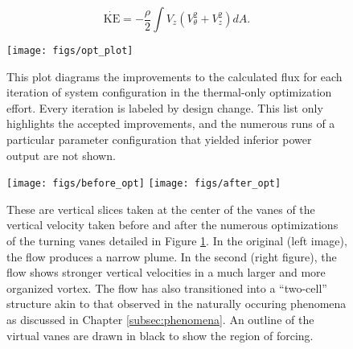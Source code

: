  \begin{equation}
  \dot{ \text{KE}} = -\frac{\rho }{2} \int V_z (V_{\theta}^2 + V_z^2 ) dA.
 \end{equation}

\begin{figure}[htb]
 \centering
 \texttt{[image: figs/opt\_plot]}
 \caption{This plot diagrams the improvements to the calculated flux for  
 each iteration of system configuration in the thermal-only optimization
 effort. Every iteration is labeled by design change. This list
 only highlights the accepted improvements, and the numerous runs of a
 particular parameter configuration that yielded inferior power output
 are not shown. }
 \label{fig:opt_plot}
\end{figure}






\begin{figure}[htb]
  \centering
 \texttt{[image: figs/before\_opt]}
 \hfill
 \texttt{[image: figs/after\_opt]} \\
  \caption{These are vertical slices taken at the center of the vanes of
 the vertical velocity taken before and after the numerous optimizations
 of the turning vanes detailed in Figure \ref{fig:opt_plot}. In the
 original (left image), the flow produces a narrow plume. In the second
 (right figure), the flow shows stronger vertical velocities in a much
 larger and more organized vortex. The flow has also transitioned into a
 ``two-cell'' structure akin to that observed in the naturally occuring
 phenomena as discussed in Chapter \ref{subsec:phenomena}. An outline of
 the virtual vanes are drawn in black to show the region of forcing.}
  \label{fig:opt_flow}
\end{figure}

